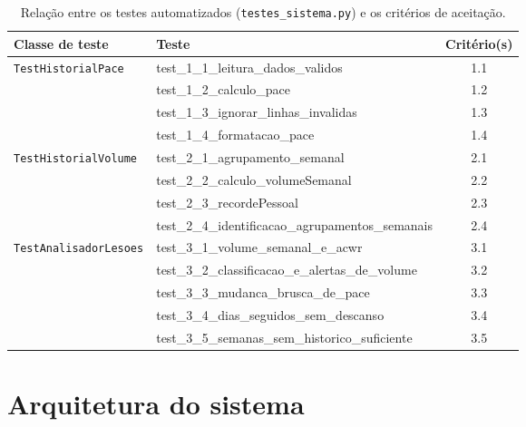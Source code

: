 \documentclass[12pt,a4paper]{article}
\begin{document}
\begin{table}[H]
  \centering
  \caption{Relação entre os testes automatizados (\texttt{testes\_sistema.py}) e os critérios de aceitação.}
  \label{tab:testes}
  \footnotesize
  \begin{tabularx}{\linewidth}{l >{\ttfamily}X c}
    \toprule
    \textbf{Classe de teste} & \textbf{\normalfont Teste} & \textbf{Critério(s)} \\
    \midrule
    \texttt{TestHistorialPace}    & test\_1\_1\_leitura\_dados\_validos             & 1.1 \\
                                  & test\_1\_2\_calculo\_pace                        & 1.2 \\
                                  & test\_1\_3\_ignorar\_linhas\_invalidas          & 1.3 \\
                                  & test\_1\_4\_formatacao\_pace                     & 1.4 \\
    \midrule
    \texttt{TestHistorialVolume}  & test\_2\_1\_agrupamento\_semanal                 & 2.1 \\
                                  & test\_2\_2\_calculo\_volumeSemanal              & 2.2 \\
                                  & test\_2\_3\_recordePessoal                      & 2.3 \\
                                  & test\_2\_4\_identificacao\_agrupamentos\_semanais & 2.4 \\
    \midrule
    \texttt{TestAnalisadorLesoes} & test\_3\_1\_volume\_semanal\_e\_acwr             & 3.1 \\
                                  & test\_3\_2\_classificacao\_e\_alertas\_de\_volume & 3.2 \\
                                  & test\_3\_3\_mudanca\_brusca\_de\_pace            & 3.3 \\
                                  & test\_3\_4\_dias\_seguidos\_sem\_descanso        & 3.4 \\
                                  & test\_3\_5\_semanas\_sem\_historico\_suficiente  & 3.5 \\
    \bottomrule
  \end{tabularx}
\end{table}

\section{Arquitetura do sistema}
\end{document}
